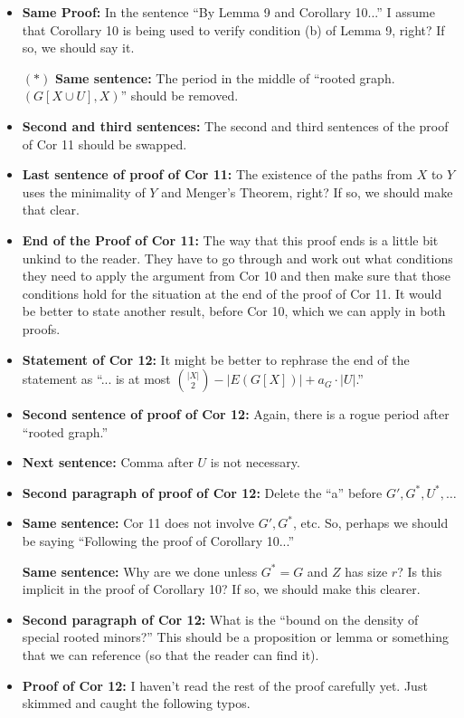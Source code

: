 \documentclass[11 pt]{article}
\begin{document}
\begin{itemize}
\item \textbf{Same Proof:} In the sentence ``By Lemma 9 and Corollary 10...'' I assume that Corollary 10 is being used to verify condition (b) of Lemma 9, right? If so, we should say it. 
\item[$\boldsymbol{(*)}$] \textbf{Same sentence:} The period in the middle of ``rooted graph. $(G[X\cup U],X)$'' should be removed.
\item \textbf{Second and third sentences:} The second and third sentences of the proof of Cor 11 should be swapped. 
\item \textbf{Last sentence of proof of Cor 11:} The existence of the paths from $X$ to $Y$ uses the minimality of $Y$ and Menger's Theorem, right? If so, we should make that clear. 
\item\textbf{End of the Proof of Cor 11:} The way that this proof ends is a little bit unkind to the reader. They have to go through and work out what conditions they need to apply the argument from Cor 10 and then make sure that those conditions hold for the situation at the end of the proof of Cor 11. It would be better to state another result, before Cor 10, which we can apply in both proofs. 
\item \textbf{Statement of Cor 12:} It might be better to rephrase the end of the statement as ``... is at most $\binom{|X|}{2} - |E(G[X])| + a_G\cdot |U|$.'' 
\item \textbf{Second sentence of proof of Cor 12:} Again, there is a rogue period after ``rooted graph.''
\item \textbf{Next sentence:} Comma after $U$ is not necessary. 
\item \textbf{Second paragraph of proof of Cor 12:} Delete the ``a'' before $G',G^*,U^*,\dots$
\item \textbf{Same sentence:} Cor 11 does not involve $G',G^*$, etc. So, perhaps we should be saying ``Following the proof of Corollary 10...''
\item[\color{red}{$\boldsymbol{(**)}$}] \textbf{Same sentence:} Why are we done unless $G^*=G$ and $Z$ has size $r$? Is this implicit in the proof of Corollary 10? If so, we should make this clearer. 
\item \textbf{Second paragraph of Cor 12:} What is the ``bound on the density of special rooted minors?'' This should be a proposition or lemma or something that we can reference (so that the reader can find it).
\item \textbf{Proof of Cor 12:} I haven't read the rest of the proof carefully yet. Just skimmed and caught the following typos. 

\end{itemize}
\end{document}

